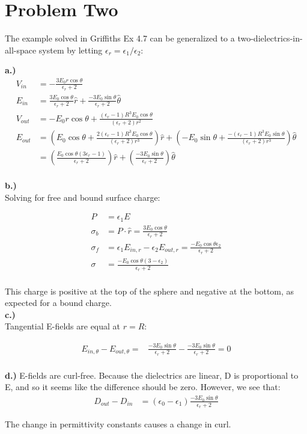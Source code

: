\documentclass[10pt]{article} %
\begin{document}
\section{Problem Two}
The example solved in Griffiths Ex 4.7 can be generalized to a two-dielectrics-in-all-space system by letting $\epsilon_r = \epsilon_1 / \epsilon_2$:

\textbf{a.)}\\
\begin{align*}
	V_{in} &= -\frac{3E_0r\cos\theta}{\epsilon_r+2}\\
	E_{in} &= \frac{3E_0\cos\theta}{\epsilon_r+2}\hat{r} + \frac{-3E_0\sin\theta}{\epsilon_r+2}\hat{\theta}\\
        V_{out} &= -E_0r\cos\theta + \frac{(\epsilon_r-1)R^3E_0\cos\theta}{(\epsilon_r+2)r^2}\\
        E_{out} &= \left(E_0\cos\theta+\frac{2(\epsilon_r-1)R^3E_0\cos\theta}{(\epsilon_r+2)r^3}\right)\hat{r} + \left(-E_0\sin\theta+\frac{-(\epsilon_r-1)R^3E_0\sin\theta}{(\epsilon_r+2)r^3}\right)\hat{\theta}\\
        &= \left(\frac{E_0\cos\theta(3\epsilon_r-1)}{\epsilon_r+2}\right)\hat{r} + \left(\frac{-3E_0\sin\theta}{\epsilon_r+2}\right)\hat{\theta}\\
\end{align*}

\textbf{b.)}\\
Solving for free and bound surface charge:

\begin{align*}
  P &= \epsilon_1E\\
  \sigma_b &= P \cdot \hat{r} = \frac{3E_0\cos\theta}{\epsilon_r+2}\\
  \sigma_f &= \epsilon_1E_{in,r} - \epsilon_2E_{out,r} = \frac{-E_0\cos\theta\epsilon_2}{\epsilon_r+2}\\
  \sigma &= \frac{-E_0\cos\theta(3-\epsilon_2)}{\epsilon_r+2}\\
\end{align*}

This charge is positive at the top of the sphere and negative at the bottom, as expected for a bound charge.\\

\textbf{c.)}\\
Tangential E-fields are equal at $r=R$:

\begin{align*}
  E_{in,\theta} - E_{out,\theta} =& \frac{-3E_0\sin\theta}{\epsilon_r+2} - \frac{-3E_0\sin\theta}{\epsilon_r+2} = 0\\
\end{align*}

\textbf{d.)}
E-fields are curl-free. Because the dielectrics are linear, D is proportional to E, and so it seems like the difference should be zero. However, we see that:\\

\begin{align*}
  D_{out} - D_{in} &= \left(\epsilon_0-\epsilon_1\right)\frac{-3E_0\sin\theta}{\epsilon_r+2}
\end{align*}

The change in permittivity constants causes a change in curl.\\
\end{document}
